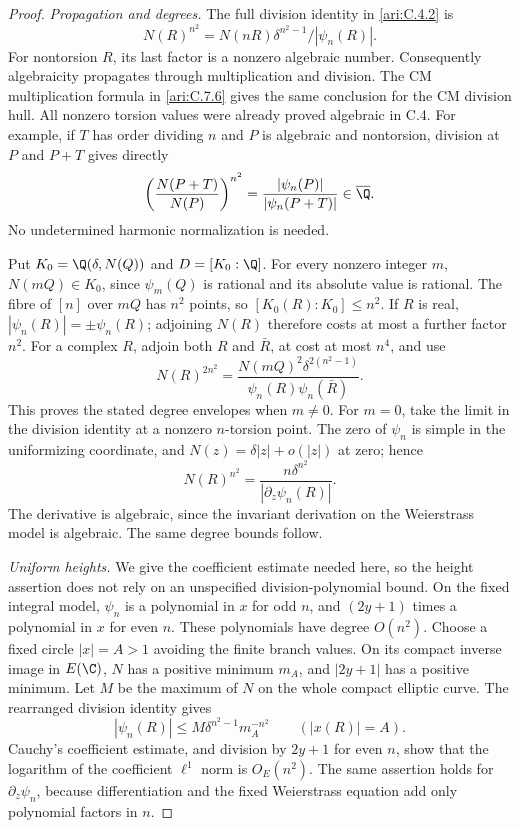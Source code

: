 \begin{proof}
\emph{Propagation and degrees.}
The full division identity in \ref{ari:C.4.2} is
\[
 N(R)^{n^2}=N(nR)\delta^{n^2-1}/|\psi_n(R)|.
\]
For nontorsion $R$, its last factor is a nonzero algebraic number.
Consequently algebraicity propagates through multiplication
and division.  The CM multiplication formula in \ref{ari:C.7.6} gives
the same conclusion for the CM division hull.  All nonzero
torsion values were already proved algebraic in C.4.
For example, if $T$ has order dividing $n$ and $P$ is algebraic
and nontorsion, division at $P$ and $P+T$ gives directly
\[
 \left(\frac{N(P+T)}{N(P)}\right)^{n^2}
       =\frac{|\psi_n(P)|}{|\psi_n(P+T)|}\in\overline\Q.
\]
No undetermined harmonic normalization is needed.

Put $K_0=\Q(\delta,N(Q))$ and $D=[K_0:\Q]$.
For every nonzero integer $m$, $N(mQ)\in K_0$, since
$\psi_m(Q)$ is rational and its absolute value is rational.
The fibre of $[n]$ over $mQ$ has $n^2$ points, so
$[K_0(R):K_0]\leq n^2$.
If $R$ is real, $|\psi_n(R)|=\pm\psi_n(R)$; adjoining
$N(R)$ therefore costs at most a further factor $n^2$.
For a complex $R$, adjoin both $R$ and $\bar R$, at cost
at most $n^4$, and use
\[
 N(R)^{2n^2}=
 \frac{N(mQ)^2\delta^{2(n^2-1)}}
      {\psi_n(R)\psi_n(\bar R)}.
\]
This proves the stated degree envelopes when $m\ne0$.
For $m=0$, take the limit in the division identity at a nonzero
$n$-torsion point.  The zero of $\psi_n$ is simple in the
uniformizing coordinate, and $N(z)=\delta|z|+o(|z|)$ at zero;
hence
\[
 N(R)^{n^2}=
       \frac{n\delta^{n^2}}{|\partial_z\psi_n(R)|}.
\]
The derivative is algebraic, since the invariant derivation on
the Weierstrass model is algebraic.  The same degree bounds follow.

\emph{Uniform heights.}
We give the coefficient estimate needed here, so the height
assertion does not rely on an unspecified division-polynomial
bound.  On the fixed integral model, $\psi_n$ is a polynomial
in $x$ for odd $n$, and $(2y+1)$ times a polynomial in $x$
for even $n$.  These polynomials have degree $O(n^2)$.
Choose a fixed circle $|x|=A>1$ avoiding the finite branch values.
On its compact inverse image in $E(\C)$, $N$ has a positive
minimum $m_A$, and $|2y+1|$ has a positive minimum.  Let $M$
be the maximum of $N$ on the whole compact elliptic curve.
The rearranged division identity gives
\[
 |\psi_n(R)|\leq M\delta^{n^2-1}m_A^{-n^2}
       \qquad(|x(R)|=A).
\]
Cauchy's coefficient estimate, and division by $2y+1$ for
even $n$, show that the logarithm of the coefficient
$\ell^1$ norm is $O_E(n^2)$.  The same assertion holds for
$\partial_z\psi_n$, because differentiation and the fixed
Weierstrass equation add only polynomial factors in $n$.


\end{proof}
